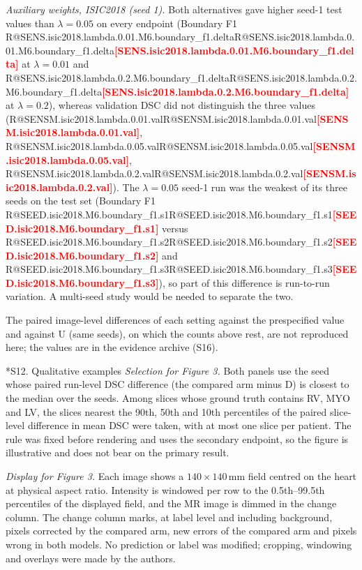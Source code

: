 \documentclass[10pt]{article}
\makeatletter
\newcommand{\R}[1]{\ifcsname R@#1\endcsname\csname R@#1\endcsname\else\textbf{\textcolor{red}{[#1]}}\fi}
\renewcommand\section{\@startsection{section}{1}{\z@}{-2.4ex \@plus -1ex \@minus -.2ex}{1.2ex \@plus .2ex}{\normalfont\large\bfseries}}
\newcommand{\fitwidth}[1]{\sbox{\fitbox}{#1}\ifdim\wd\fitbox>\linewidth\resizebox{\linewidth}{!}{\usebox{\fitbox}}\else\usebox{\fitbox}\fi}
\makeatother
\begin{document}
\emph{Auxiliary weights, ISIC2018 (seed 1).} Both alternatives gave higher seed-1 test values than $\lambda=0.05$ on every endpoint (Boundary F1 \R{SENS.isic2018.lambda.0.01.M6.boundary_f1.delta} at $\lambda=0.01$ and \R{SENS.isic2018.lambda.0.2.M6.boundary_f1.delta} at $\lambda=0.2$), whereas validation DSC did not distinguish the three values (\R{SENSM.isic2018.lambda.0.01.val}, \R{SENSM.isic2018.lambda.0.05.val}, \R{SENSM.isic2018.lambda.0.2.val}). The $\lambda=0.05$ seed-1 run was the weakest of its three seeds on the test set (Boundary F1 \R{SEED.isic2018.M6.boundary_f1.s1} versus \R{SEED.isic2018.M6.boundary_f1.s2} and \R{SEED.isic2018.M6.boundary_f1.s3}), so part of this difference is run-to-run variation. A multi-seed study would be needed to separate the two.
\begin{table}[!htbp]\centering
\fitwidth{}
\caption{Validation and test means per setting (presp. = prespecified value). ISIC2018 validation DSC is on the 519 documented validation images; ``--'' where the reference run's validation record is not on the same pipeline.}
\end{table}
The paired image-level differences of each setting against the prespecified value and against U (same seeds), on which the counts above rest, are not reproduced here; the values are in the evidence archive (S16).


\section*{S12. Qualitative examples}
\emph{Selection for Figure 3.} Both panels use the seed whose paired run-level DSC difference (the compared arm minus D) is closest to the median over the seeds. Among slices whose ground truth contains RV, MYO and LV, the slices nearest the 90th, 50th and 10th percentiles of the paired slice-level difference in mean DSC were taken, with at most one slice per patient. The rule was fixed before rendering and uses the secondary endpoint, so the figure is illustrative and does not bear on the primary result.

\emph{Display for Figure 3.} Each image shows a $140\times140$\,mm field centred on the heart at physical aspect ratio. Intensity is windowed per row to the 0.5th--99.5th percentiles of the displayed field, and the MR image is dimmed in the change column. The change column marks, at label level and including background, pixels corrected by the compared arm, new errors of the compared arm and pixels wrong in both models. No prediction or label was modified; cropping, windowing and overlays were made by the authors.
\end{document}
